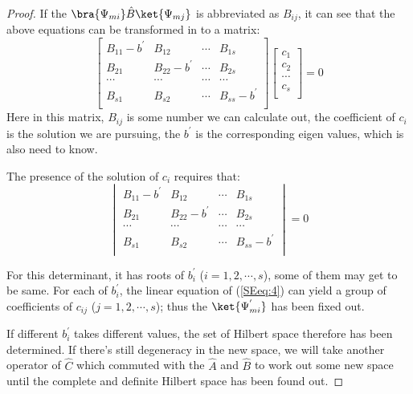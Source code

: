 \begin{proof}
If the $\bra{\Psi_{mi}}\hat{B}\ket{\Psi_{mj}}$ is abbreviated as
$B_{ij}$, it can see that the above equations can be transformed in
to a matrix:
\begin{equation}\label{SEeq:4}
\begin{bmatrix}
  B_{11}-b^{'} & B_{12} & \cdots & B_{1s} \\
  B_{21} & B_{22}-b^{'} & \cdots & B_{2s} \\
  \cdots & \cdots & \cdots & \cdots \\
  B_{s1} & B_{s2} & \cdots & B_{ss}-b^{'} \\
\end{bmatrix}
\begin{bmatrix}
  c_{1} \\
  c_{2} \\
  \cdots \\
  c_{s} \\
\end{bmatrix}
 = 0
\end{equation}
Here in this matrix, $B_{ij}$ is some number we can calculate out,
the coefficient of $c_{i}$ is the solution we are pursuing, the
$b^{'}$ is the corresponding eigen values, which is also need to
know.

The presence of the solution of $c_{i}$ requires that:
\begin{equation}\label{}
\begin{vmatrix}
  B_{11}-b^{'} & B_{12} & \cdots & B_{1s} \\
  B_{21} & B_{22}-b^{'} & \cdots & B_{2s} \\
  \cdots & \cdots & \cdots & \cdots \\
  B_{s1} & B_{s2} & \cdots & B_{ss}-b^{'} \\
\end{vmatrix} = 0
\end{equation}

For this determinant, it has roots of $b^{'}_{i}$ ($i=1, 2, \cdots,
s$), some of them may get to be same. For each of $b^{'}_{i}$, the
linear equation of (\ref{SEeq:4}) can yield a group of coefficients
of $c_{ij}$ ($j=1, 2, \cdots, s$); thus the $\ket{\Psi^{'}_{mi}}$
has been fixed out.

If different $b^{'}_{i}$ takes different values, the set of Hilbert
space therefore has been determined. If there's still degeneracy in
the new space, we will take another operator of $\hat{C}$ which
commuted with the $\hat{A}$ and $\hat{B}$ to work out some new space
until the complete and definite Hilbert space has been found out.
\qedhere
\end{proof}

